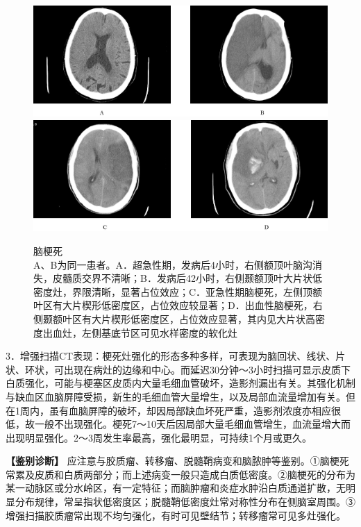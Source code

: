 \begin{figure}[!htbp]
 \centering
 \includegraphics[width=\textwidth,height=\textheight,keepaspectratio]{./images/Image00038.jpg}
 \includegraphics[width=\textwidth,height=\textheight,keepaspectratio]{./images/Image00039.jpg}
 \captionsetup{justification=centering}
 \caption{脑梗死\\{\small A、B为同一患者。A．超急性期，发病后4小时，右侧额顶叶脑沟消失，皮髓质交界不清晰；B．发病后42小时，右侧颞额顶叶大片状低密度灶，界限清晰，显著占位效应；C．亚急性期脑梗死，左侧顶额叶区有大片楔形低密度区，占位效应较显著；D．出血性脑梗死，右侧颞额叶区有大片楔形低密度区，占位效应显著，其内见大片状高密度出血灶，左侧基底节区可见水样密度的软化灶}}
 \label{fig2-21}
  \end{figure} 

3．增强扫描CT表现：梗死灶强化的形态多种多样，可表现为脑回状、线状、片状、环状，可出现在病灶的边缘和中心。而延迟30分钟～3小时扫描可显示皮质下白质强化，可能与梗塞区皮质内大量毛细血管破坏，造影剂漏出有关。其强化机制与缺血区血脑屏障受损，新生的毛细血管大量增生，以及局部血流量增加有关。但在1周内，虽有血脑屏障的破坏，却因局部缺血坏死严重，造影剂浓度亦相应很低，故一般不出现强化。梗死7～10天后因局部大量毛细血管增生，血流量增大而出现明显强化。2～3周发生率最高，强化最明显，可持续1个月或更久。

\textbf{【鉴别诊断】}
应注意与胶质瘤、转移瘤、脱髓鞘病变和脑脓肿等鉴别。①脑梗死常累及皮质和白质两部分；而上述病变一般只造成白质低密度。②脑梗死的分布为某一动脉区或分水岭区，有一定特征；而脑肿瘤和炎症水肿沿白质通道扩散，无明显分布规律，常呈指状低密度区；脱髓鞘低密度灶常对称性分布在侧脑室周围。③增强扫描胶质瘤常出现不均匀强化，有时可见壁结节；转移瘤常可见多灶强化。

